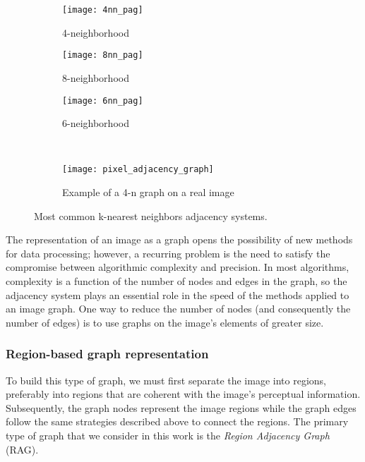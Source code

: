 \begin{figure}[!ht]
    \centering

	\begin{subfigure}[b]{0.2\textwidth}
    	\texttt{[image: 4nn\_pag]}
        \caption{ 4-neighborhood}
    \end{subfigure}\qquad   
    \begin{subfigure}[b]{0.2\textwidth}
    	\texttt{[image: 8nn\_pag]}
        \caption{8-neighborhood}
    \end{subfigure}\qquad
    \begin{subfigure}[b]{0.23\textwidth}
    	\texttt{[image: 6nn\_pag]}
        \caption{6-neighborhood}
    \end{subfigure}\\[5ex]    
    \begin{subfigure}[b]{0.5\textwidth}
        \texttt{[image: pixel\_adjacency\_graph]}
        \caption{Example of a 4-n graph on a real image}
        \label{fig:pag_example}
    \end{subfigure}         
        	    
    \caption{Most common k-nearest neighbors adjacency systems.}\label{fig:pixel_adjacency_graph}    
\end{figure}

The representation of an image as a graph opens the possibility of new methods for data processing; however, a recurring problem is the need to satisfy the compromise between algorithmic complexity and precision. In most algorithms, complexity is a function of the number of nodes and edges in the graph, so the adjacency system plays an essential role in the speed of the methods applied to an image graph. One way to reduce the number of nodes (and consequently the number of edges) is to use graphs on the image's elements of greater size.

\subsubsection{Region-based graph representation}

To build this type of graph, we must first separate the image into regions, preferably into regions that are coherent with the image's perceptual information. Subsequently, the graph nodes represent the image regions while the graph edges follow the same strategies described above to connect the regions. The primary type of graph that we consider in this work is the \textit{Region Adjacency Graph }(RAG).


